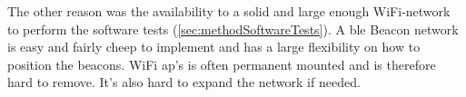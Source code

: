 \bigskip

The other reason was the availability to a solid and large enough WiFi-network to perform the software tests (\cref{sec:methodSoftwareTests}).
A \acrshort{ble} Beacon network is easy and fairly cheep to implement and has a large flexibility on how to position the beacons.
WiFi \acrshort{ap}'s is often permanent mounted and is therefore hard to remove.
It's also hard to expand the network if needed.
